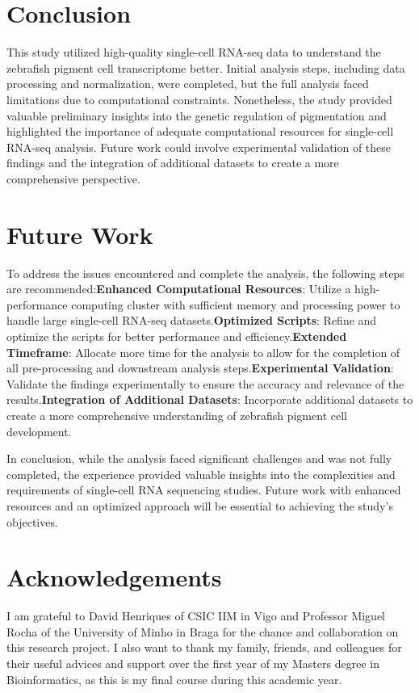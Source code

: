 \documentclass[runningheads]{llncs}
\begin{document}
\section{Conclusion}

This study utilized high-quality single-cell RNA-seq data to understand the zebrafish pigment cell transcriptome better. Initial analysis steps, including data processing and normalization, were completed, but the full analysis faced limitations due to computational constraints. Nonetheless, the study provided valuable preliminary insights into the genetic regulation of pigmentation and highlighted the importance of adequate computational resources for single-cell RNA-seq analysis. Future work could involve experimental validation of these findings and the integration of additional datasets to create a more comprehensive perspective.

\section{Future Work}
To address the issues encountered and complete the analysis, the following steps are recommended:\newline\textbf{Enhanced Computational Resources}: Utilize a high-performance computing cluster with sufficient memory and processing power to handle large single-cell RNA-seq datasets.\newline\textbf{Optimized Scripts}: Refine and optimize the scripts for better performance and efficiency.\newline\textbf{Extended Timeframe}: Allocate more time for the analysis to allow for the completion of all pre-processing and downstream analysis steps.\newline\textbf{Experimental Validation}: Validate the findings experimentally to ensure the accuracy and relevance of the results.\newline\textbf{Integration of Additional Datasets}: Incorporate additional datasets to create a more comprehensive understanding of zebrafish pigment cell development.

In conclusion, while the analysis faced significant challenges and was not fully completed, the experience provided valuable insights into the complexities and requirements of single-cell RNA sequencing studies. Future work with enhanced resources and an optimized approach will be essential to achieving the study's objectives.

\section*{Acknowledgements}
I am grateful to David Henriques of CSIC IIM in Vigo and Professor Miguel Rocha of the University of Minho in Braga for the chance and collaboration on this research project. I also want to thank my family, friends, and colleagues for their useful advices and support over the first year of my Masters degree in Bioinformatics, as this is my final course during this academic year.

\newpage


\end{document}
